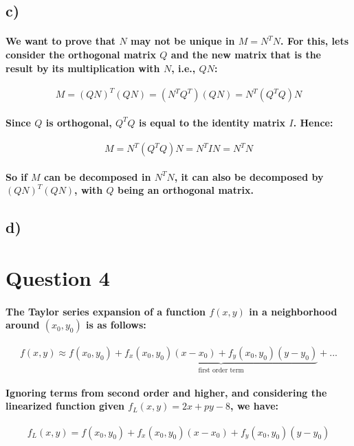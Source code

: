 \documentclass[a4paper]{article}    %
\begin{document}
\subsection*{c)}

\paragraph{We want to prove that $N$ may not be unique in $M=N^TN$. For this, lets consider the orthogonal matrix $Q$ and the new matrix that is the result by its multiplication with $N$, i.e., $QN$:}
    \[M = (QN)^T(QN) = (N^TQ^T)(QN) = N^T(Q^TQ)N\]

\paragraph{Since $Q$ is orthogonal, $Q^TQ$ is equal to the identity matrix $I$. Hence:}
    \[M= N^T(Q^TQ)N = N^TIN = N^TN\]

\paragraph{So if $M$ can be decomposed in $N^TN$, it can also be decomposed by $(QN)^T(QN)$, with $Q$ being an orthogonal matrix.}

\subsection*{d)}


\newpage

\section*{Question 4}

\paragraph{The Taylor series expansion of a function $f(x,y)$ in a neighborhood around $(x_0,y_0)$ is as follows:}
    \[f(x,y) \approx f(x_0,y_0) + \underbrace{f_x(x_0,y_0)(x-x_0)+f_y(x_0,y_0)(y-y_0)}_{\text{first order term}} + ...\]

\paragraph{Ignoring terms from second order and higher, and considering the linearized function given $f_L(x,y)=2x+py-8$, we have:}
    \[f_L(x,y) = f(x_0,y_0) + f_x(x_0,y_0)(x-x_0)+f_y(x_0,y_0)(y-y_0)\]
\end{document}
